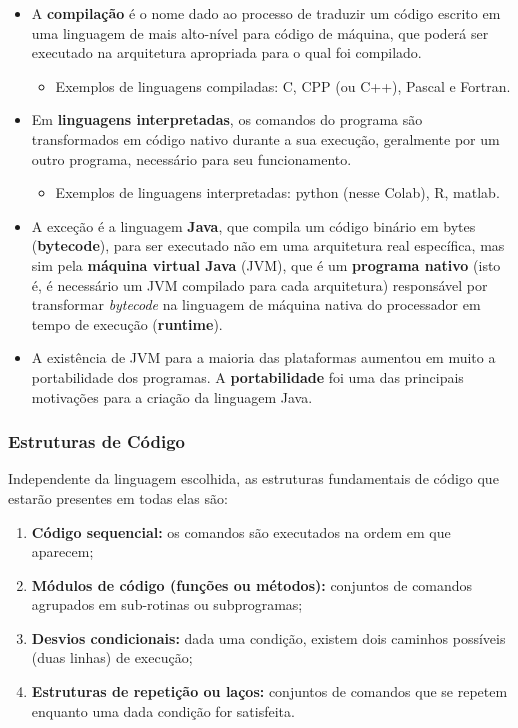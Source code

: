 \documentclass[12pt,a4paper]{article}
\providecommand{\tightlist}{%
      \setlength{\itemsep}{0pt}\setlength{\parskip}{0pt}}
\begin{document}
    \begin{itemize}
\item
  A \textbf{compilação} é o nome dado ao processo de traduzir um código
  escrito em uma linguagem de mais alto-nível para código de máquina,
  que poderá ser executado na arquitetura apropriada para o qual foi
  compilado.

  \begin{itemize}
  \tightlist
  \item
    Exemplos de linguagens compiladas: C, CPP (ou C++), Pascal e
    Fortran.
  \end{itemize}
\item
  Em \textbf{linguagens interpretadas}, os comandos do programa são
  transformados em código nativo durante a sua execução, geralmente por
  um outro programa, necessário para seu funcionamento.

  \begin{itemize}
  \tightlist
  \item
    Exemplos de linguagens interpretadas: python (nesse Colab), R,
    matlab.
  \end{itemize}
\item
  A exceção é a linguagem \textbf{Java}, que compila um código binário
  em bytes (\textbf{bytecode}), para ser executado não em uma
  arquitetura real específica, mas sim pela \textbf{máquina virtual
  Java} (JVM), que é um \textbf{programa nativo} (isto é, é necessário
  um JVM compilado para cada arquitetura) responsável por transformar
  \emph{bytecode} na linguagem de máquina nativa do processador em tempo
  de execução (\textbf{runtime}).
\item
  A existência de JVM para a maioria das plataformas aumentou em muito a
  portabilidade dos programas. A \textbf{portabilidade} foi uma das
  principais motivações para a criação da linguagem Java.
\end{itemize}

    \hypertarget{estruturas-de-cuxf3digo}{%
\subsubsection{Estruturas de Código}\label{estruturas-de-cuxf3digo}}

    Independente da linguagem escolhida, as estruturas fundamentais de
código que estarão presentes em todas elas são:

\begin{enumerate}
\def\labelenumi{\arabic{enumi}.}
\tightlist
\item
  \textbf{Código sequencial:} os comandos são executados na ordem em que
  aparecem;
\item
  \textbf{Módulos de código (funções ou métodos):} conjuntos de comandos
  agrupados em sub-rotinas ou subprogramas;
\item
  \textbf{Desvios condicionais:} dada uma condição, existem dois
  caminhos possíveis (duas linhas) de execução;
\item
  \textbf{Estruturas de repetição ou laços:} conjuntos de comandos que
  se repetem enquanto uma dada condição for satisfeita.
\end{enumerate}
\end{document}
